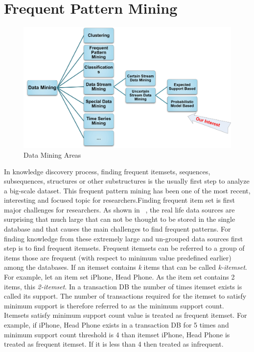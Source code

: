 \section{Frequent Pattern Mining}
\begin{figure}
\centering
  \includegraphics[width=.9\textwidth]{images/mining_class.jpg}
\caption{Data Mining Areas}
\label{figure:mining_class}
\end{figure}
In knowledge discovery process, finding frequent itemsets, sequences, subsequences, structures or other substructures is the usually first step to analyze a big-scale dataset. This frequent pattern mining has been one of the most recent, interesting and focused topic for  researchers.Finding frequent item set is first major challenges for researchers. As shown in ~\cite{apriori}, the real life data sources are surprising that much large that can not be thought to be stored in the single database and that causes the main challenges to find frequent patterns. For finding knowledge from these extremely large and un-grouped data sources first step is to find frequent itemsets. Frequent itemsets can be referred to a group of items those are frequent (with respect to minimum value predefined earlier) among the databases. If an itemset contains \emph{k} items that can be called \emph{k-itemset}. For example, let an item set {iPhone, Head Phone}. As the item set contains 2 items, this \emph{2-itemset}. In a transaction DB the number of times itemset exists is called its support. The number of transactions required for the itemset to satisfy minimum support is therefore referred to as the minimum support count. Itemsets satisfy minimum support count value is treated as frequent itemset. For example, if {iPhone, Head Phone} exists in a transaction DB for 5 times and minimum support count threshold is 4 than itemset {iPhone, Head Phone} is treated as frequent itemset. If it is less than 4 then treated as  infrequent.\\
